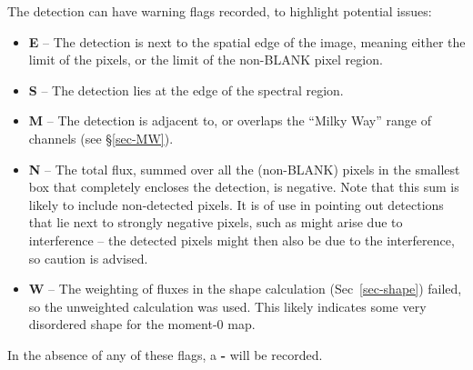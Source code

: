 The detection can have warning flags recorded, to highlight potential
issues:
\begin{itemize}
\item \textbf{E} -- The detection is next to the spatial edge of the
  image, meaning either the limit of the pixels, or the limit of the
  non-BLANK pixel region.
\item \textbf{S} -- The detection lies at the edge of the spectral
  region.
\item \textbf{M} -- The detection is adjacent to, or overlaps the
  ``Milky Way'' range of channels (see \S\ref{sec-MW}).
\item \textbf{N} -- The total flux, summed over all the (non-BLANK)
  pixels in the smallest box that completely encloses the detection,
  is negative. Note that this sum is likely to include non-detected
  pixels. It is of use in pointing out detections that lie next to
  strongly negative pixels, such as might arise due to interference --
  the detected pixels might then also be due to the interference, so
  caution is advised.
\item \textbf{W} -- The weighting of fluxes in the shape calculation
  (Sec~\ref{sec-shape}) failed, so the unweighted calculation was
  used. This likely indicates some very disordered shape for the
  moment-0 map.
\end{itemize}
In the absence of any of these flags, a \textbf{-} will be recorded.


